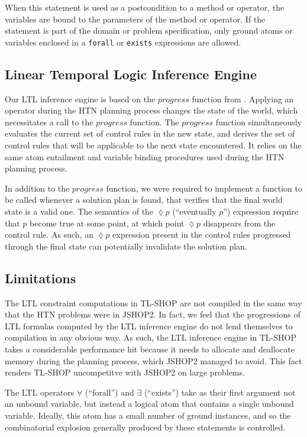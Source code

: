 \documentclass[12pt]{article}
\begin{document}
When this statement is used as a postcondition to a method or operator, the
variables are bound to the parameters of the method or operator. If the
statement is part of the domain or problem specification, only ground atoms or variables
enclosed in a \texttt{forall} or \texttt{exists} expressions are allowed.

\subsection{Linear Temporal Logic Inference Engine}
Our LTL inference engine is based on the $progress$ function from 
\cite{nau2004apt}. Applying an operator during the HTN planning process changes 
the state of the world, which necessitates a call to the $progress$ function. 
The $progress$ function simultaneously evaluates the current set of control 
rules in the new state, and derives the set of control rules that will be 
applicable to the next state encountered. It relies on the same atom entailment 
and variable binding procedures used during the HTN planning process.

In addition to the $progress$ function, we were required to implement a 
function to be called whenever a solution plan is found, that verifies that the 
final world state is a valid one. The semantics of the $\lozenge p$ 
(``eventually $p$'') expression require that $p$ become true at some point, at 
which point $\lozenge p$ disappears from the control rule. As such, an 
$\lozenge p$ expression present in the control rules progressed through the 
final state can potentially invalidate the solution plan.

\subsection{Limitations} 
The LTL constraint computations in TL-SHOP are not compiled in the same way 
that the HTN problems were in JSHOP2. In fact, we feel that the progressions of 
LTL formulas computed by the LTL inference engine do not lend themselves to 
compilation in any obvious way. As such, the LTL inference engine in TL-SHOP 
takes a considerable performance hit because it needs to allocate and 
deallocate memory during the planning process, which JSHOP2 managed to avoid.
This fact renders TL-SHOP uncompetitve with JSHOP2 on large problems.

The LTL operators $\forall$ (``forall'') and $\exists$ (``exists'') take as 
their first argument not an unbound variable, but instead a logical atom that 
contains a single unbound variable. Ideally, this atom has a small number of 
ground instances, and so the combinatorial explosion generally produced by 
these statements is controlled.
\end{document}
